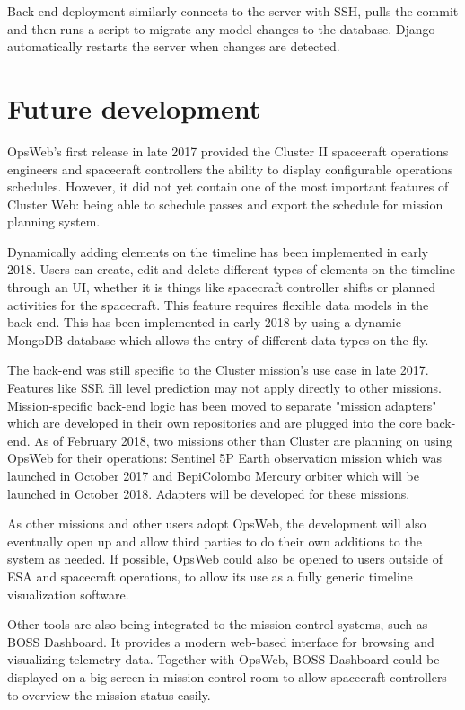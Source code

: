 Back-end deployment similarly connects to the server with SSH, pulls the commit and then runs a script to migrate any model changes to the database. Django automatically restarts the server when changes are detected.
\section{Future development}
OpsWeb's first release in late 2017 provided the Cluster II spacecraft operations engineers and spacecraft controllers the ability to display configurable operations schedules. However, it did not yet contain one of the most important features of Cluster Web: being able to schedule passes and export the schedule for mission planning system.

Dynamically adding elements on the timeline has been implemented in early 2018. Users can create, edit and delete different types of elements on the timeline through an UI, whether it is things like spacecraft controller shifts or planned activities for the spacecraft. This feature requires flexible data models in the back-end. This has been implemented in early 2018 by using a dynamic MongoDB database which allows the entry of different data types on the fly.

The back-end was still specific to the Cluster mission's use case in late 2017. Features like SSR fill level prediction may not apply directly to other missions. Mission-specific back-end logic has been moved to separate "mission adapters" which are developed in their own repositories and are plugged into the core back-end. As of February 2018, two missions other than Cluster are planning on using OpsWeb for their operations: Sentinel 5P Earth observation mission which was launched in October 2017 and BepiColombo Mercury orbiter which will be launched in October 2018. Adapters will be developed for these missions.

As other missions and other users adopt OpsWeb, the development will also eventually open up and allow third parties to do their own additions to the system as needed. If possible, OpsWeb could also be opened to users outside of ESA and spacecraft operations, to allow its use as a fully generic timeline visualization software.

Other tools are also being integrated to the mission control systems, such as BOSS Dashboard. \cite{boss} It provides a modern web-based interface for browsing and visualizing telemetry data. Together with OpsWeb, BOSS Dashboard could be displayed on a big screen in mission control room to allow spacecraft controllers to overview the mission status easily.